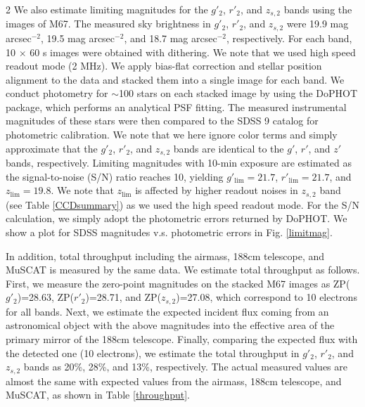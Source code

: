 \documentclass[a4paper,12pt]{spieman}  %
\begin{document}
\begin{spacing}{2}
We also estimate limiting magnitudes for the $g'_2$, $r'_2$, and $z_{s,2}$ bands using the images of M67.
The measured sky brightness in $g'_2$, $r'_2$, and $z_{s,2}$ were
19.9 mag arcsec$^{-2}$, 19.5 mag arcsec$^{-2}$, and 18.7 mag arcsec$^{-2}$, respectively.
For each band, 10 $\times$ 60 s images were obtained with dithering.
We note that we used high speed readout mode (2 MHz).
We apply bias-flat correction and stellar position alignment to the data and stacked them into a single image
for each band.
We conduct photometry for $\sim$100 stars on each stacked image
by using the DoPHOT package\cite{1993PASP..105.1342S},  which performs an analytical PSF fitting.
The measured instrumental magnitudes of these stars were then compared to
the SDSS 9 catalog\cite{2012ApJS..203...21A} for photometric calibration.
We note that we here ignore color terms and simply approximate that
the $g'_2$, $r'_2$, and $z_{s,2}$ bands are identical to the $g'$, $r'$, and $z'$ bands, respectively. 
Limiting magnitudes with 10-min exposure are estimated as the signal-to-noise (S/N) ratio reaches 10,
yielding $g'_\mathrm{lim} = 21.7$, $r'_\mathrm{lim} = 21.7$, and $z_\mathrm{lim} = 19.8$.
We note that $z_\mathrm{lim}$ is affected by higher readout noises in $z_{s,2}$ band
(see Table \ref{CCDsummary}) as we used the high speed readout mode.
For the S/N calculation, we simply adopt the photometric errors returned by DoPHOT.
We show a plot for SDSS magnitudes v.s. photometric errors in Fig. \ref{limitmag}. 

In addition, total throughput including the airmass, 188cm telescope, and MuSCAT
is measured by the same data.
We estimate total throughput as follows.
First, we measure the zero-point magnitudes on the stacked M67 images as
ZP($g'_2$)=28.63, ZP($r'_2$)=28.71, and ZP($z_{s,2}$)=27.08,
which correspond to 10 electrons for all bands.
Next, we estimate the expected incident flux coming from an astronomical object
with the above magnitudes
into the effective area of the primary mirror of the 188cm telescope.
Finally, comparing the expected flux with the detected one (10 electrons),
we estimate the total throughput
in $g'_2$, $r'_2$, and $z_{s,2}$ bands
as 20\%, 28\%, and 13\%, respectively.
The actual measured values are almost the same with expected values from the airmass,
188cm telescope, and MuSCAT, as shown in Table \ref{throughput}.



\end{spacing}
\end{document}

